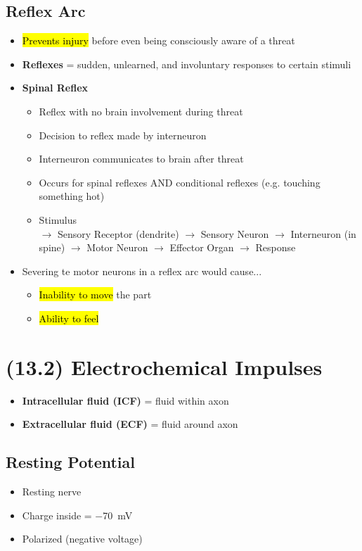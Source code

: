 \documentclass[a4paper,12pt]{article}
\begin{document}
\subsection{Reflex Arc}
\begin{itemize}
    \item{\hl{Prevents injury} before even being consciously aware of a threat}
    \item{\textbf{Reflexes} = sudden, unlearned, and involuntary responses to certain stimuli}
    \item{
            \textbf{Spinal Reflex}
            \begin{itemize}
                \item{Reflex with no brain involvement during threat}
                \item{Decision to reflex made by interneuron}
                \item{Interneuron communicates to brain after threat}
                \item{Occurs for spinal reflexes AND conditional reflexes (e.g. touching something hot)}
                \item{Stimulus \\ $\longrightarrow$ Sensory Receptor (dendrite) $\longrightarrow$ Sensory Neuron $\longrightarrow$ Interneuron (in spine) $\longrightarrow$ Motor Neuron $\longrightarrow$ Effector Organ $\longrightarrow$ Response}
            \end{itemize}
        }
    \item{
        Severing te motor neurons in a reflex arc would cause...
        \begin{itemize}
            \item{\hl{Inability to move} the part}
            \item{\hl{Ability to feel}}
        \end{itemize}
    }
\end{itemize}

\section{(13.2) Electrochemical Impulses}
\begin{itemize}
    \item{\textbf{Intracellular fluid (ICF)} = fluid within axon}
    \item{\textbf{Extracellular fluid (ECF)} = fluid around axon}
\end{itemize}

\subsection{Resting Potential}
\begin{itemize}
    \item{Resting nerve}
    \item{Charge inside = \SI{-70}{\mV}}
    \item{Polarized (negative voltage)}
\end{itemize}
\end{document}
